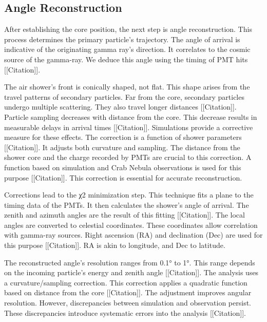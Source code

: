 \subsection{Angle Reconstruction}

After establishing the core position, the next step is angle reconstruction.
This process determines the primary particle's trajectory.
The angle of arrival is indicative of the originating gamma ray's direction.
It correlates to the cosmic source of the gamma-ray.
We deduce this angle using the timing of PMT hits [[Citation]].

The air shower's front is conically shaped, not flat.
This shape arises from the travel patterns of secondary particles.
Far from the core, secondary particles undergo multiple scattering.
They also travel longer distances [[Citation]].
Particle sampling decreases with distance from the core.
This decrease results in measurable delays in arrival times [[Citation]].
Simulations provide a corrective measure for these effects.
The correction is a function of shower parameters [[Citation]].
It adjusts both curvature and sampling.
The distance from the shower core and the charge recorded by PMTs are crucial to this correction.
A function based on simulation and Crab Nebula observations is used for this purpose [[Citation]].
This correction is essential for accurate reconstruction.

Corrections lead to the χ2 minimization step.
This technique fits a plane to the timing data of the PMTs.
It then calculates the shower's angle of arrival.
The zenith and azimuth angles are the result of this fitting [[Citation]].
The local angles are converted to celestial coordinates.
These coordinates allow correlation with gamma-ray sources.
Right ascension (RA) and declination (Dec) are used for this purpose [[Citation]]. RA is akin to longitude, and Dec to latitude.

The reconstructed angle's resolution ranges from 0.1° to 1°.
This range depends on the incoming particle's energy and zenith angle [[Citation]].
The analysis uses a curvature/sampling correction.
This correction applies a quadratic function based on distance from the core [[Citation]].
The adjustment improves angular resolution.
However, discrepancies between simulation and observation persist.
These discrepancies introduce systematic errors into the analysis [[Citation]].

